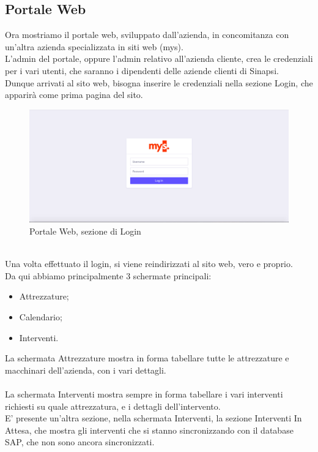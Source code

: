 \subsection{Portale Web}
Ora mostriamo il portale web, sviluppato dall'azienda, in concomitanza con un'altra azienda specializzata in siti web (mys).\\
L'admin del portale, oppure l'admin relativo all'azienda cliente, crea le credenziali per i vari utenti, che saranno i dipendenti delle aziende clienti di Sinapsi.\\
Dunque arrivati al sito web, bisogna inserire le credenziali nella sezione Login, che apparirà come prima pagina del sito.\\
\begin{figure}[!h] 
	\centering 
	\includegraphics[scale = 0.3]{immagini/portale/login.png} 
	\caption {Portale Web, sezione di Login}
\end{figure}
\\Una volta effettuato il login, si viene reindirizzati al sito web, vero e proprio.\\
Da qui abbiamo principalmente 3 schermate principali:
\begin{itemize}
	\item Attrezzature;
	\item Calendario;
	\item Interventi.\\
\end{itemize}
La schermata Attrezzature mostra in forma tabellare tutte le attrezzature e macchinari dell'azienda, con i vari dettagli.\\\\
La schermata Interventi mostra sempre in forma tabellare i vari interventi richiesti su quale attrezzatura, e i dettagli dell'intervento.\\
E' presente un'altra sezione, nella schermata Interventi, la sezione Interventi In Attesa, che mostra gli interventi che si stanno sincronizzando con il database SAP, che non sono ancora sincronizzati.
\newpage

